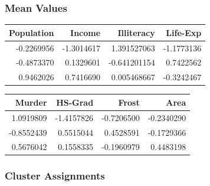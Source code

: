 \documentclass[11pt]{article}
\begin{document}
\subsubsection*{Mean Values}
\label{sec:orgd1b3190}

\begin{center}
\begin{tabular}{rrrr}
Population & Income & Illiteracy & Life-Exp\\
\hline
-0.2269956 & -1.3014617 & 1.391527063 & -1.1773136\\
-0.4873370 & 0.1329601 & -0.641201154 & 0.7422562\\
0.9462026 & 0.7416690 & 0.005468667 & -0.3242467\\
\end{tabular}
\end{center}

\begin{center}
\begin{tabular}{rrrr}
Murder & HS-Grad & Frost & Area\\
\hline
1.0919809 & -1.4157826 & -0.7206500 & -0.2340290\\
-0.8552439 & 0.5515044 & 0.4528591 & -0.1729366\\
0.5676042 & 0.1558335 & -0.1960979 & 0.4483198\\
\end{tabular}
\end{center}

\subsubsection*{Cluster Assignments}
\label{sec:org7f85d08}
\end{document}
